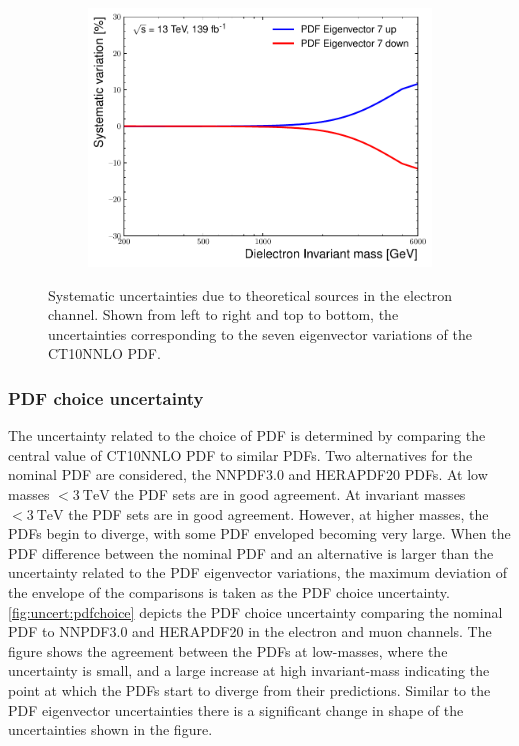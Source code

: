 \begin{figure}[h!]
\begin{subfigure}[b]{0.42\textwidth}
        \includegraphics[width=\textwidth]{figures/analysis/datamc/Uncertainties/theory/ee/backgroundTemplate_KF_PDF_EV7.pdf}
        \label{fig:uncert:eepdfvar7}
    \end{subfigure}
    \caption{Systematic uncertainties due to theoretical sources in the electron channel. Shown from left to right and top to bottom, the uncertainties corresponding to the seven eigenvector variations of the CT10NNLO PDF.}
    \label{fig:ucnert:eepdfvar}
\end{figure}

\subsubsection{PDF choice uncertainty}
The uncertainty related to the choice of PDF is determined by comparing the central value of CT10NNLO PDF to similar PDFs. Two alternatives for the nominal PDF are considered, the NNPDF3.0 and HERAPDF20 PDFs. At low masses $< \SI{3}{\tera\electronvolt}$ the PDF sets are in good agreement. At invariant masses $< \SI{3}{\tera\electronvolt}$ the PDF sets are in good agreement. However, at higher masses, the PDFs begin to diverge, with some PDF enveloped becoming very large. When the PDF difference between the nominal PDF and an alternative is larger than the uncertainty related to the PDF eigenvector variations, the maximum deviation of the envelope of the comparisons is taken as the PDF choice uncertainty. \cref{fig:uncert:pdfchoice} depicts the PDF choice uncertainty comparing the nominal PDF to NNPDF3.0 and HERAPDF20 in the electron and muon channels. The figure shows the agreement between the PDFs at low-masses, where the uncertainty is small, and a large increase at high invariant-mass indicating the point at which the PDFs start to diverge from their predictions. Similar to the PDF eigenvector uncertainties there is a significant change in shape of the uncertainties shown in the figure.

